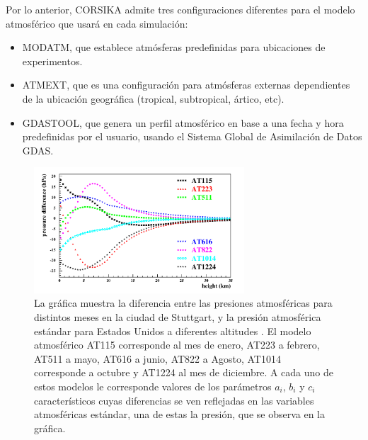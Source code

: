 Por lo anterior, CORSIKA admite tres configuraciones diferentes para el modelo atmosférico que usará en cada simulación:
\begin{itemize}
    \item MODATM, que establece atmósferas predefinidas para ubicaciones de experimentos.
    \item ATMEXT, que es una configuración para atmósferas externas dependientes de la ubicación geográfica (tropical, subtropical, ártico, etc).
    \item GDASTOOL, que genera un perfil atmosférico en base a una fecha y hora predefinidas por el usuario, usando el Sistema Global de Asimilación de Datos GDAS.
\end{itemize}{}

\begin{figure}[htb!]
\centering
\includegraphics[width=0.7\textwidth]{Figs/ATMmodel.png}
\caption[Presión atmosférica vs la altura para Estados Unidos y Stuttgart.]{La gráfica muestra la diferencia entre las presiones atmosféricas para distintos meses en la ciudad de Stuttgart, y la presión atmosférica estándar para Estados Unidos a diferentes altitudes \parencite{Heck1998}. El modelo atmosférico AT115 corresponde al mes de enero, AT223 a febrero, AT511 a mayo, AT616 a junio, AT822 a Agosto, AT1014 corresponde a octubre y AT1224 al mes de diciembre. A cada uno de estos modelos le corresponde valores de los parámetros $a_{i}$, $b_{i}$ y $c_{i}$ característicos cuyas diferencias se ven reflejadas en las variables atmosféricas estándar, una de estas la presión, que se observa en la gráfica.}
 \label{fig:fig6}
\end{figure}






